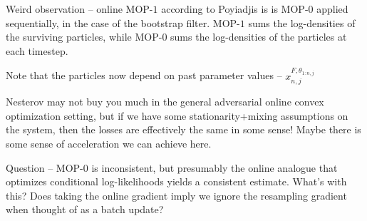\documentclass{article}
\begin{document}
Weird observation -- online MOP-$1$ according to Poyiadjis is is MOP-$0$ applied sequentially, in the case of the bootstrap filter. MOP-$1$ sums the log-densities of the surviving particles, while MOP-$0$ sums the log-densities of the particles at each timestep. 

Note that the particles now depend on past parameter values -- $x_{n,j}^{F, \theta_{1:n,j}}$

Nesterov may not buy you much in the general adversarial online convex optimization setting, but if we have some stationarity+mixing assumptions on the system, then the losses are effectively the same in some sense! Maybe there is some sense of acceleration we can achieve here. 

Question -- MOP-0 is inconsistent, but presumably the online analogue that optimizes conditional log-likelihoods yields a consistent estimate. What's with this? Does taking the online gradient imply we ignore the resampling gradient when thought of as a batch update?




\appendix
\renewcommand{\thefigure}{A\arabic{figure}}
\setcounter{figure}{0}
\end{document}
